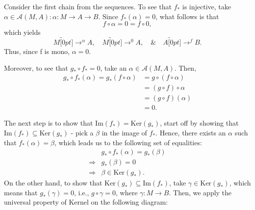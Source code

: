 \documentclass[../category_theory.tex]{subfiles}
\begin{document}
\begin{proof*}
	Consider the first chain from the sequences. To see that \(f_{*}\) is injective, take \(\alpha \in \mathcal{A}(M, A):\alpha :M\rightarrow A\rightarrow B\). Since \(f_{*}(\alpha )=0\), what follows is that
	\[
		f\circ \alpha =0 = f\circ 0,
	\]
	which yields
	\[
		M\overbracket[0pt]{\rightarrow}^{\alpha }A, \quad M\overbracket[0pt]{\rightarrow}^{0}A, \quad\&\quad A\overbracket[0pt]{\rightarrow}^{f}B.
	\]
	Thus, since f is mono, \(\alpha = 0\).

	Moreover, to see that \(g_{*}\circ f_{*}=0\), take an \(\alpha \in \mathcal{A}(M, A)\). Then,
	\begin{align*}
		g_{*}\circ f_{*}(\alpha )=g_{*}(f\circ \alpha ) & = g\circ (f\circ \alpha ) \\
		                                                & = (g\circ f)\circ \alpha  \\
		                                                & = (g\circ f)(\alpha )     \\
		                                                & = 0.
	\end{align*}

	The next step is to show that \(\mathrm{Im}(f_{*}) = \mathrm{Ker}(g_{*})\), start off by showing that \(\mathrm{Im}(f_{*})\subseteq \mathrm{Ker}(g_{*})\) - pick a \(\beta \) in the image of \(f_{*}\). Hence, there exists an \(\alpha \) such that \(f_{*}(\alpha )=\beta \), which leads us to the following set of equalities:
	\begin{align*}
		            & g_{*}\circ f_{*}(\alpha )=g_{*}(\beta ) \\
		\Rightarrow & g_{*}(\beta )=0                         \\
		\Rightarrow & \beta \in \mathrm{Ker}(g_{*}).
	\end{align*}
	On the other hand, to show that \(\mathrm{Ker}(g_{*})\subseteq \mathrm{Im}(f_{*})\), take \(\gamma \in \mathrm{Ker}(g_{*})\), which means that \(g_{*}(\gamma )=0\), i.e., \(g\circ \gamma =0\), where \(\gamma :M\rightarrow B \). Then, we apply the universal property of Kernel on the following diagram:
	\begin{center}
\end{center}
\end{proof*}
\end{document}
